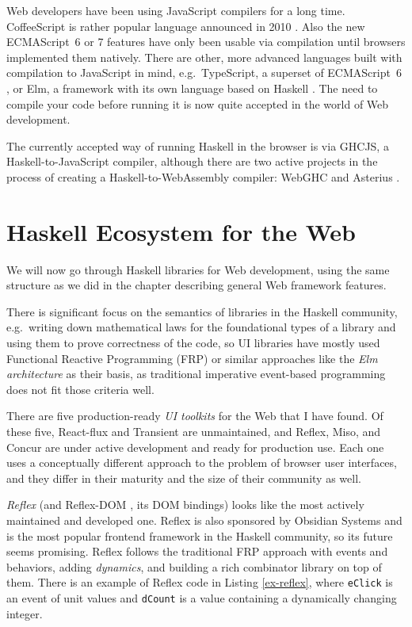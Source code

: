 \documentclass[english,odsaz]{fitthesis}
\begin{document}
Web developers have been using JavaScript compilers for a long time.
CoffeeScript is rather popular language announced in 2010
\cite{coffeescript}. Also the new ECMAScript~6 or 7 features have only been usable
via compilation until browsers implemented them natively. There are other, more
advanced languages built with compilation to JavaScript in mind,
e.g.~TypeScript, a superset of ECMAScript~6 \cite{typescript}, or Elm, a framework
with its own language based on Haskell \cite{czaplicki2012elm}. The need to
compile your code before running it is now quite accepted in the world of Web
development.

The currently accepted way of running Haskell in the browser is via GHCJS, a
Haskell-to-JavaScript compiler, although there are two active projects in the
process of creating a Haskell-to-WebAssembly compiler: WebGHC \cite{webghc} and
Asterius \cite{asterius}.

\section{Haskell Ecosystem for the Web}
\label{sec:orgc9cef99}
We will now go through Haskell libraries for Web development, using the same
structure as we did in the chapter describing general Web framework features.

There is significant focus on the semantics of libraries in the Haskell
community, e.g.~writing down mathematical laws for the foundational types of a
library and using them to prove correctness of the code, so UI libraries have
mostly used Functional Reactive Programming (FRP) or similar approaches like
the \emph{Elm architecture} \cite{loder2018web} as their basis, as traditional
imperative event-based programming does not fit those criteria well.

There are five production-ready \emph{UI toolkits} for the Web that I have found. Of
these five, React-flux and Transient are unmaintained, and Reflex, Miso, and
Concur are under active development and ready for production use. Each one uses
a conceptually different approach to the problem of browser user interfaces, and
they differ in their maturity and the size of their community as well.

\emph{Reflex} \cite{reflex} (and Reflex-DOM \cite{reflex-dom}, its DOM bindings) looks like
the most actively maintained and developed one. Reflex is also sponsored by
Obsidian Systems \cite{obsidian} and is the most popular frontend framework in the
Haskell community, so its future seems promising. Reflex follows the traditional
FRP approach with events and behaviors, adding \emph{dynamics}, and building a rich
combinator library on top of them. There is an example of Reflex code in Listing
\ref{ex-reflex}, where \texttt{eClick} is an event of unit values and \texttt{dCount} is a value
containing a dynamically changing integer.
\end{document}
